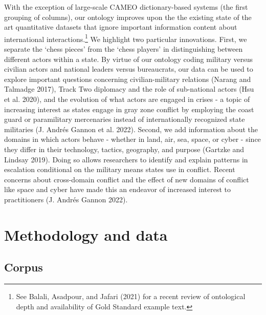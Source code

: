 \documentclass{article}
\begin{document}
With the exception of large-scale CAMEO dictionary-based systems (the
first grouping of columns), our ontology improves upon the the existing
state of the art quantitative datasets that ignore important information
content about international interactions.\footnote{See Balali, Asadpour,
  and Jafari (2021) for a recent review of ontological depth and
  availability of Gold Standard example text.} We highlight two
particular innovations. First, we separate the `chess pieces' from the
`chess players' in distinguishing between different actors within a
state. By virtue of our ontology coding military versus civilian actors
and national leaders versus bureaucrats, our data can be used to explore
important questions concerning civilian-military relations (Narang and
Talmadge 2017), Track Two diplomacy and the role of sub-national actors
(Hsu et al. 2020), and the evolution of what actors are engaged in
crises - a topic of increasing interest as states engage in gray zone
conflict by employing the coast guard or paramilitary mercenaries
instead of internationally recognized state militaries (J. Andrés Gannon
et al. 2022). Second, we add information about the domains in which
actors behave - whether in land, air, sea, space, or cyber - since they
differ in their technology, tactics, geography, and purpose (Gartzke and
Lindsay 2019). Doing so allows researchers to identify and explain
patterns in escalation conditional on the military means states use in
conflict. Recent concerns about cross-domain conflict and the effect of
new domains of conflict like space and cyber have made this an endeavor
of increased interest to practitioners (J. Andrés Gannon 2022).

\hypertarget{methodology-and-data}{%
\section{Methodology and data}\label{methodology-and-data}}

\hypertarget{corpus}{%
\subsection{Corpus}\label{corpus}}
\end{document}
